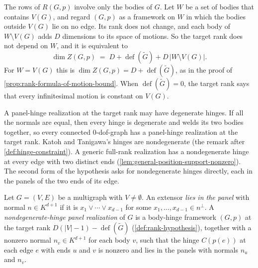 \begin{remark}
  \label{rem:rank-hypothesis-relative}
  The rows of $R(G,p)$ involve only the bodies of $G$. Let $W$ be a set
  of bodies that contains $V(G)$, and regard $(G,p)$ as a framework on
  $W$ in which the bodies outside $V(G)$ lie on no edge. Its rank does
  not change, and each body of $W \setminus V(G)$ adds $D$ dimensions to
  its space of motions. So the target rank does not depend on $W$, and
  it is equivalent to
  \[
    \dim Z(G,p) \;=\; D + \operatorname{def}(\tilde G)
    + D\,|W \setminus V(G)|.
  \]
  For $W = V(G)$ this is $\dim Z(G,p) = D + \operatorname{def}(\tilde G)$,
  as in the proof of \cref{prop:rank-formula-of-motion-bound}. When
  $\operatorname{def}(\tilde G) = 0$, the target rank says that every
  infinitesimal motion is constant on $V(G)$.
\end{remark}

A panel-hinge realization at the target rank may have degenerate hinges.
If all the normals are equal, then every hinge is degenerate and welds
its two bodies together, so every connected $0$-dof-graph has a
panel-hinge realization at the target rank. Katoh and Tanigawa's hinges
are nondegenerate (the remark after \cref{def:hinge-constraint}). A
generic full-rank realization has a nondegenerate hinge at every edge
with two distinct ends (\cref{lem:general-position-support-nonzero}). The
second form of the hypothesis asks for nondegenerate hinges directly,
each in the panels of the two ends of its edge.

\begin{definition}
  \label{def:genuine-hinge-realization}
  \leanok
  Let $G = (V, E)$ be a multigraph with $V \neq \emptyset$. An extensor
  \emph{lies in the panel} with normal $n \in K^{d+1}$ if it is
  $x_1 \vee \cdots \vee x_{d-1}$ for some $x_1, \dots, x_{d-1} \in n^\perp$.
  A \emph{nondegenerate-hinge panel realization} of $G$ is a body-hinge
  framework $(G,p)$ at the target rank
  $D(|V| - 1) - \operatorname{def}(\tilde G)$
  (\cref{def:rank-hypothesis}), together with a nonzero normal
  $n_v \in K^{d+1}$ for each body $v$, such that the hinge $C(p(e))$ at
  each edge $e$ with ends $u$ and $v$ is nonzero and lies in the panels
  with normals $n_u$ and $n_v$.
\end{definition}

